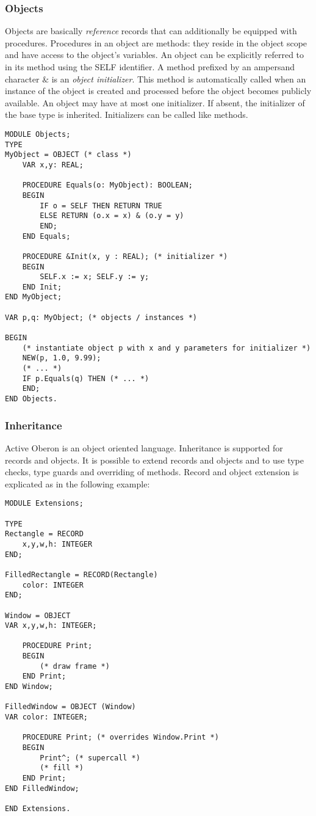 \documentclass[a4paper,11pt]{article}
\begin{document}
\subsubsection{Objects}\label{section:Objects}
Objects are basically {\em reference} records that can additionally be equipped with procedures. Procedures in an object are methods: they reside in the object scope and have access to the object's variables. An object can be explicitly referred to in its method using the SELF identifier.
A method prefixed by an ampersand character $\&$ is an \emph{object initializer}. This method is automatically called when an instance of the object is created and processed before the object becomes publicly available. An object may have at most one initializer. If absent, the initializer of the base type is inherited. Initializers can be called like methods.

\begin{lstlisting}[language=Oberon,frame=none,caption=Usage of Objects]
MODULE Objects;
TYPE
MyObject = OBJECT (* class *)
    VAR x,y: REAL;

    PROCEDURE Equals(o: MyObject): BOOLEAN;
    BEGIN
        IF o = SELF THEN RETURN TRUE
        ELSE RETURN (o.x = x) & (o.y = y)
        END;
    END Equals;

    PROCEDURE &Init(x, y : REAL); (* initializer *)
    BEGIN
        SELF.x := x; SELF.y := y;
    END Init;
END MyObject;

VAR p,q: MyObject; (* objects / instances *)

BEGIN
    (* instantiate object p with x and y parameters for initializer *)
    NEW(p, 1.0, 9.99);
    (* ... *)
    IF p.Equals(q) THEN (* ... *)
    END;
END Objects.
\end{lstlisting}

\subsubsection{Inheritance}
Active Oberon is an object oriented language. Inheritance is supported for records and objects. It is possible to extend records and objects and to use type checks, type guards and overriding of methods.
Record and object extension is explicated as in the following example:

\begin{lstlisting}[language=Oberon,frame=none,caption=Type extension of records and objects]
MODULE Extensions;

TYPE
Rectangle = RECORD
    x,y,w,h: INTEGER
END;

FilledRectangle = RECORD(Rectangle)
    color: INTEGER
END;

Window = OBJECT
VAR x,y,w,h: INTEGER;

    PROCEDURE Print;
    BEGIN
        (* draw frame *)
    END Print;
END Window;

FilledWindow = OBJECT (Window)
VAR color: INTEGER;

    PROCEDURE Print; (* overrides Window.Print *)
    BEGIN
        Print^; (* supercall *)
        (* fill *)
    END Print;
END FilledWindow;

END Extensions.
\end{lstlisting}
\end{document}
